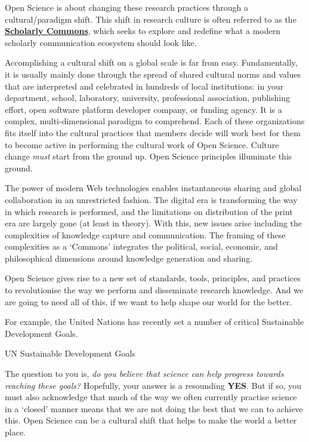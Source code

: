 \documentclass[]{book}
\begin{document}
{{Open Science is about changing these research practices through a cultural/paradigm shift. This shift in research culture is often referred to as the \href{https://www.force11.org/group/scholarly-commons-working-group}{\textbf{Scholarly Commons}}, which seeks to explore and redefine what a modern scholarly communication ecosystem should look like.

Accomplishing a cultural shift on a global scale is far from easy. Fundamentally, it is usually mainly done through the spread of shared cultural norms and values that are interpreted and celebrated in hundreds of local institutions: in your department, school, laboratory, university, professional association, publishing effort, open software platform developer company, or funding agency. It is a complex, multi-dimensional paradigm to comprehend. Each of these organizations fits itself into the cultural practices that members decide will work best for them to become active in performing the cultural work of Open Science. Culture change \emph{must} start from the ground up. Open Science principles illuminate this ground.

The power of modern Web technologies enables instantaneous sharing and global collaboration in an unrestricted fashion. The digital era is transforming the way in which research is performed, and the limitations on distribution of the print era are largely gone (at least in theory). With this, new issues arise including the complexities of knowledge capture and communication. The framing of these complexities as a `Commons' integrates the political, social, economic, and philosophical dimensions around knowledge generation and sharing.

Open Science gives rise to a new set of standards, tools, principles, and practices to revolutionise the way we perform and disseminate research knowledge. And we are going to need all of this, if we want to help shape our world for the better.

For example, the United Nations has recently set a number of critical Sustainable Development Goals.

UN Sustainable Development Goals

The question to you is, \emph{do you believe that science can help progress towards reaching these goals?} Hopefully, your answer is a resounding \textbf{YES}. But if so, you must also acknowledge that much of the way we often currently practise science in a `closed' manner means that we are not doing the best that we can to achieve this. Open Science can be a cultural shift that helps to make the world a better place.

}}
\end{document}
